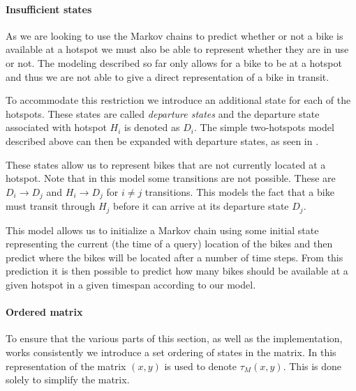 \paragraph{Insufficient states}
As we are looking to use the Markov chains to predict whether or not a bike is available at a hotspot we must also be able to represent whether they are in use or not.
The modeling described so far only allows for a bike to be at a hotspot and thus we are not able to give a direct representation of a bike in transit.

To accommodate this restriction we introduce an additional state for each of the hotspots.
These states are called \emph{departure states} and the departure state associated with hotspot $H_i$ is denoted as $D_i$.
The simple two-hotspots model described above can then be expanded with departure states, as seen in .



These states allow us to represent bikes that are not currently located at a hotspot.
Note that in this model some transitions are not possible.
These are $D_i \rightarrow D_j$ and $H_i \rightarrow D_j $ for $i \neq j$ transitions.
This models the fact that a bike must transit through $H_j$ before it can arrive at its departure state $D_j$.

This model allows us to initialize a Markov chain using some initial state representing the current (the time of a query) location of the bikes and then predict where the bikes will be located after a number of time steps.
From this prediction it is then possible to predict how many bikes should be available at a given hotspot in a given timespan according to our model.

\paragraph{Ordered matrix}
To ensure that the various parts of this section, as well as the implementation, works consistently we introduce a set ordering of states in the matrix.
In this representation of the matrix $(x, y)$ is used to denote $\tau_M(x, y)$.
This is done solely to simplify the matrix.

